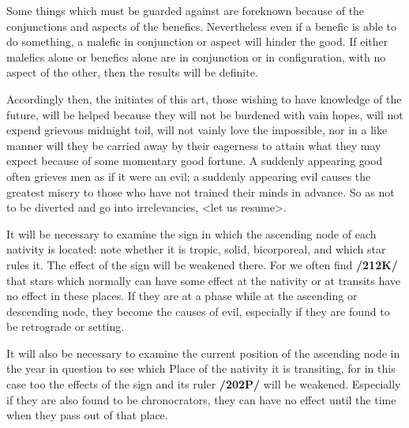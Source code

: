 Some things which must be guarded against are foreknown because of the conjunctions and aspects of the benefics. Nevertheless even if a benefic is able to do something, a malefic in conjunction or aspect will hinder the good. If either malefics alone or benefics alone are in conjunction or in configuration, with no aspect of the other, then the results will be definite. 

Accordingly then, the initiates of this art, those wishing to have knowledge of the future, will be helped because they will not be burdened with vain hopes, will not expend grievous midnight toil, will not vainly love the impossible, nor in a like manner will they be carried away by their eagerness to attain what they may expect because of some momentary good fortune. A suddenly appearing good often grieves men as if it were an evil; a suddenly appearing evil causes the greatest misery to those who have not trained their minds in advance.
So as not to be diverted and go into irrelevancies, <let us resume>. 

It will be necessary to examine the sign in which the ascending node of each nativity is located: note whether it is tropic, solid, bicorporeal, and which star rules it. The effect of the sign will be weakened there. For we often find \textbf{/212K/} that stars which normally can have some effect at the nativity or at transits have no effect in these places. If they are at a phase while at the ascending or descending node, they become the causes of evil, especially if they are found to be retrograde or setting. 

It will also be necessary to examine the current position of the ascending node in the year in question to see which Place of the nativity it is transiting, for in this case too the effects of the sign and its ruler \textbf{/202P/} will be weakened. Especially if they are also
found to be chronocrators, they can have no effect until the time when they pass out of that place.

\newpage
